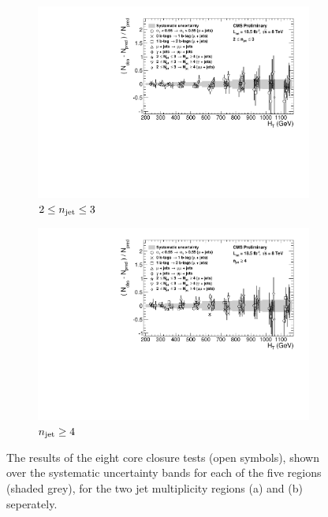 \begin{figure}[ht!]
  \centering
  \begin{subfigure}[b]{0.7\textwidth}
    \includegraphics[width=\textwidth]{Figs/syst/v0/le3j/summary_plot}
    \caption{$2 \leq n_{\text{jet}} \leq 3$}
    \label{fig:closure_summary_le3j}
  \end{subfigure}             
  \begin{subfigure}[b]{0.7\textwidth}
    \includegraphics[width=\textwidth]{Figs/syst/v0/ge4j/summary_plot}
    \caption{$n_{\text{jet}} \geq 4$}
    \label{fig:closure_summary_ge4j}
  \end{subfigure}             
  \caption{The results of the eight core closure tests (open symbols), shown 
  over the systematic uncertainty bands for each of the five \HT regions
  (shaded grey), for the two jet multiplicity regions (a) \njlow and (b) \njhigh 
  seperately.}
  \label{fig:closure_summary}
\end{figure}


